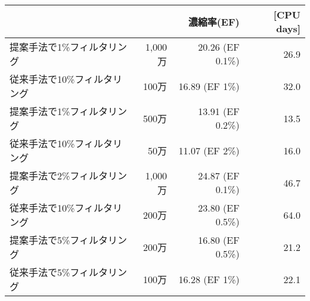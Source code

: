 \begin{enumerate}
\begin{table}[htbp]
\begin{tabular}{l|rrr}
												&														&濃縮率(EF)				&[CPU days]		\\ \hline
	提案手法で1\%フィルタリング		&1,000万											&20.26 (EF 0.1\%)		&26.9				\\
	従来手法で10\%フィルタリング	&100万												&16.89 (EF 1\%)			&32.0				\\ \hline
	提案手法で1\%フィルタリング		&500万												&13.91 (EF 0.2\%)		&13.5				\\
	従来手法で10\%フィルタリング	&50万												&11.07 (EF 2\%)			&16.0				\\ \hline
	提案手法で2\%フィルタリング		&1,000万											&24.87 (EF 0.1\%)		&46.7				\\
	従来手法で10\%フィルタリング	&200万												&23.80 (EF 0.5\%)		&64.0				\\ \hline
	提案手法で5\%フィルタリング		&200万												&16.80 (EF 0.5\%)		&21.2				\\
	従来手法で5\%フィルタリング		&100万												&16.28 (EF 1\%)			&22.1				\\ \hline
	

	\end{tabular}
\end{table}
	
\end{enumerate}
